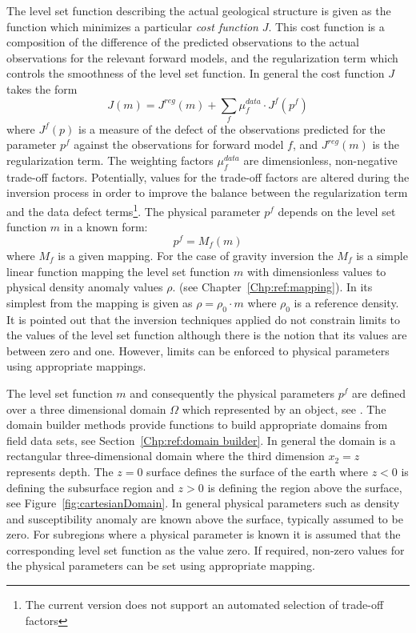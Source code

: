 The level set function describing the actual geological structure is given as
the function which minimizes a particular \emph{cost function}
$J$.
This cost function is a composition of the difference of the predicted
observations to the actual observations for the relevant forward models, and
the regularization term which controls the smoothness of
the level set function.
In general the cost function $J$ takes the form
\begin{equation}\label{REF:EQU:INTRO 1}
J(m) = J^{reg}(m) + \sum_{f} \mu^{data}_{f} \cdot J^{f}(p^f)
\end{equation} 
where $J^{f}(p)$ is a measure of the defect of the observations predicted for
the parameter $p^f$ against the observations for forward model $f$, and
$J^{reg}(m)$ is the regularization term.
The weighting factors $\mu^{data}_{f}$ are dimensionless, non-negative
trade-off factors.
Potentially, values for the trade-off factors are altered during the inversion
process in order to improve the balance between the regularization term and
the data defect terms\footnote{The current version does not support an automated selection 
of trade-off factors}.
The physical parameter $p^f$ depends on the level set function
$m$ in a known form:
\begin{equation}\label{REF:EQU:INTRO 1b}
p^f = M_{f}(m)
\end{equation} 
where $M_f$ is a given mapping. For the case of gravity inversion
the $M_f$ is a simple linear function mapping the level set function $m$ with dimensionless values 
to physical density anomaly values $\rho$.
(see Chapter~\ref{Chp:ref:mapping}). In its simplest from the mapping is given as 
$\rho = \rho_0 \cdot m$ where $\rho_0$ is a reference density. It is pointed out that 
the inversion techniques applied do not constrain limits to the values of the level set function
although there is the notion that its values are between zero and one. However, 
limits can be enforced to physical parameters using appropriate mappings.

The level set function $m$ and consequently the physical parameters $p^f$ are 
defined over a three dimensional domain $\Omega$ which represented by an \escript 
{} object, see \cite{ESCRIPT}. The domain builder methods provide 
functions to build appropriate domains from field data sets, see Section~\ref{Chp:ref:domain builder}.
In general the domain is a rectangular three-dimensional domain where the third dimension $x_2=z$ represents
depth. The $z=0$ surface defines the surface of the earth where $z<0$ is defining the subsurface region and
$z>0$ is defining the region above the surface, see Figure~\ref{fig:cartesianDomain}. In general physical parameters such as
density and susceptibility anomaly are known above the surface, typically assumed to be zero. 
For subregions where a physical parameter is known it is assumed that the corresponding level set function as 
the value zero. If required, non-zero values for the physical parameters can be set using appropriate mapping.      

